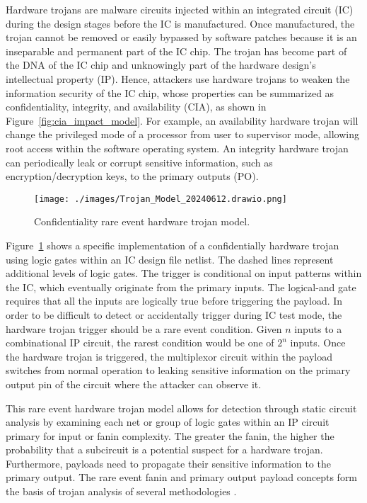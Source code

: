 Hardware trojans are malware circuits injected within an integrated circuit (IC)
during the design stages before the IC is manufactured. Once manufactured, the
trojan cannot be removed or easily bypassed by software patches because it is an
inseparable and permanent part of the IC chip. The trojan has become part of the
DNA of the IC chip and unknowingly part of the hardware design's intellectual
property (IP). Hence, attackers use hardware trojans to weaken the information
security of the IC chip, whose properties can be summarized as confidentiality,
integrity, and availability (CIA), as shown in
Figure~\ref{fig:cia_impact_model}. For example, an availability hardware trojan
will change the privileged mode of a processor from user to supervisor mode,
allowing root access within the software operating system. An integrity hardware
trojan can periodically leak or corrupt sensitive information, such as
encryption/decryption keys, to the primary outputs (PO).

\begin{figure}[H]
    \centering
    \texttt{[image: ./images/Trojan\_Model\_20240612.drawio.png]}
    \caption{Confidentiality rare event hardware trojan model.}
    \label{fig:cre_impact_model}
\end{figure}

Figure~\ref{fig:cre_impact_model} shows a specific implementation of a
confidentially hardware trojan using logic gates within an IC design file
netlist. The dashed lines represent additional levels of logic gates. The
trigger is conditional on input patterns within the IC, which eventually
originate from the primary inputs. The logical-and gate requires that all the
inputs are logically true before triggering the payload. In order to be
difficult to detect or accidentally trigger during IC test mode, the hardware
trojan trigger should be a rare event condition. Given $n$ inputs to a
combinational IP circuit, the rarest condition would be one of $2^n$ inputs.
Once the hardware trojan is triggered, the multiplexor circuit within the
payload switches from normal operation to leaking sensitive information on the
primary output pin of the circuit where the attacker can observe it.

This rare event hardware trojan model allows for detection through static
circuit analysis by examining each net or group of logic gates within an IP
circuit primary for input or fanin complexity. The greater the fanin, the higher
the probability that a subcircuit is a potential suspect for a hardware trojan.
Furthermore, payloads need to propagate their sensitive information to the
primary output. The rare event fanin and primary output payload concepts form
the basis of trojan analysis of several methodologies \cite{4484928, 7604700,
hasegawa2020hardware, px6s-sm21-22}.


